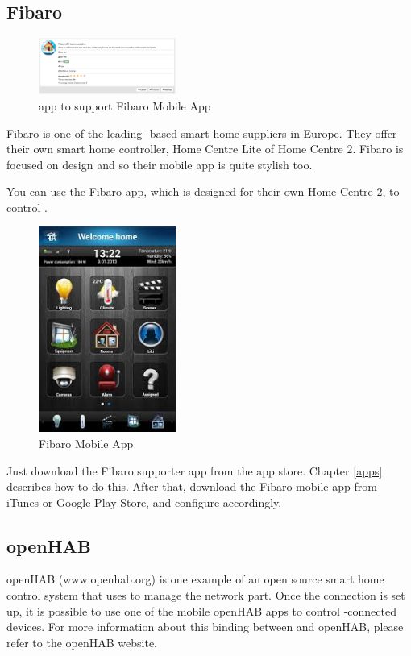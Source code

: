 \subsection{Fibaro}

\begin{figure}
\begin{center}
\includegraphics[width=0.4\textwidth]{pngs/cap5/mobile6.png}
\caption{\zway app to support Fibaro Mobile App}
\label{mobile6}
\end{center}
\end{figure}

Fibaro is one of the leading \zwave-based smart home suppliers in Europe. They offer their 
own \zwave smart home controller, Home Centre Lite of Home Centre 2. Fibaro is focused on 
design and so their mobile app is quite stylish too.

You can use the Fibaro app, which is designed for their own Home Centre 2, to control 
\zway.

\begin{figure}
\begin{center}
\includegraphics[width=0.4\textwidth]{pngs/cap5/mobile8.jpeg}
\caption{Fibaro Mobile App}
\label{mobile8}
\end{center}
\end{figure}

Just download the Fibaro supporter app from the \zway app store. Chapter \ref{apps} 
describes how to do this. After that, download the Fibaro mobile app from iTunes or Google 
Play Store, and configure accordingly.

\subsection{openHAB}

openHAB (www.openhab.org) is one example of an open source smart home control system that 
uses \zway to manage the \zwave network part. Once the connection is set up, it is possible 
to use one of the mobile openHAB apps to control \zway-connected devices. For more information 
about this binding between \zway and openHAB, please refer to the openHAB website.
